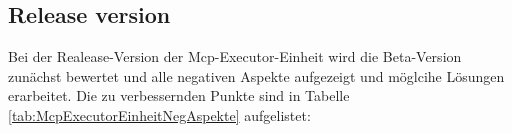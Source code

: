 \subsection{Release version}
\label{kap:McpExecutorReleaseversion}
Bei der Realease-Version der Mcp-Executor-Einheit wird die Beta-Version zunächst bewertet und alle negativen Aspekte aufgezeigt und möglcihe Lösungen erarbeitet. Die zu verbessernden Punkte sind in Tabelle \ref{tab:McpExecutorEinheitNegAspekte} aufgelistet:

 
